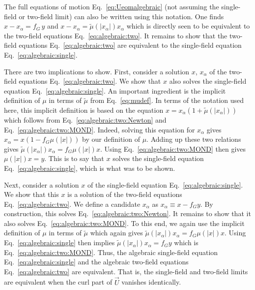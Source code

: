 \documentclass[reprint, amsmath,amssymb, nofootinbib, aps, prd]{revtex4-2}
\begin{document}
The full equations of motion Eq.~\eqref{eq:Ueomalgebraic} (not assuming the single-field or two-field limit) can also be written using this notation.
One finds $x - x_\alpha  = f_G \, y$ and $x - x_\alpha = \tilde{\mu}(|x_\alpha|) x_\alpha$ which is directly seen to be equivalent to the two-field equations Eq.~\eqref{eq:algebraic:two}.
It remains to show that the two-field equations Eq.~\eqref{eq:algebraic:two} are equivalent to the single-field equation Eq.~\eqref{eq:algebraic:single}.

There are two implications to show.
First, consider a solution $x$, $x_\alpha$ of the two-field equations Eq.~\eqref{eq:algebraic:two}.
We show that $x$ also solves the single-field equation Eq.~\eqref{eq:algebraic:single}.
An important ingredient is the implicit definition of $\mu$ in terms of $\tilde{\mu}$ from Eq.~\eqref{eq:mudef}.
In terms of the notation used here, this implicit definition is based on the equation $x = x_\alpha (1+\tilde{\mu}(|x_\alpha|))$ which follows from Eq.~\eqref{eq:algebraic:two:Newton} and Eq.~\eqref{eq:algebraic:two:MOND}.
Indeed, solving this equation for $x_\alpha$ gives $x_\alpha = x (1 - f_G \mu(|x|))$ by our definition of $\mu$.
Adding up these two relations gives $\tilde{\mu}(|x_\alpha|) x_\alpha = f_G \mu(|x|) x$.
Using Eq.~\eqref{eq:algebraic:two:MOND} then gives $\mu(|x|) x = y$.
This is to say that $x$ solves the single-field equation Eq.~\eqref{eq:algebraic:single}, which is what was to be shown.

Next, consider a solution $x$ of the single-field equation Eq.~\eqref{eq:algebraic:single}.
We show that this $x$ is a solution of the two-field equations Eq.~\eqref{eq:algebraic:two}.
We define a candidate $x_\alpha$ as $x_\alpha \equiv x - f_G y$.
By construction, this solves Eq.~\eqref{eq:algebraic:two:Newton}.
It remains to show that it also solves Eq.~\eqref{eq:algebraic:two:MOND}.
To this end, we again use the implicit definition of $\mu$ in terms of $\tilde{\mu}$ which again gives $\tilde{\mu}(|x_\alpha|) x_\alpha = f_G \mu(|x|) x$.
Using Eq.~\eqref{eq:algebraic:single} then implies $\tilde{\mu}(|x_\alpha|) x_\alpha = f_G y$ which is Eq.~\eqref{eq:algebraic:two:MOND}.
Thus, the algebraic single-field equation Eq.~\eqref{eq:algebraic:single} and the algebraic two-field equations Eq.~\eqref{eq:algebraic:two} are equivalent.
That is, the single-field and two-field limits are equivalent when the curl part of $\vec{U}$ vanishes identically.
\end{document}
